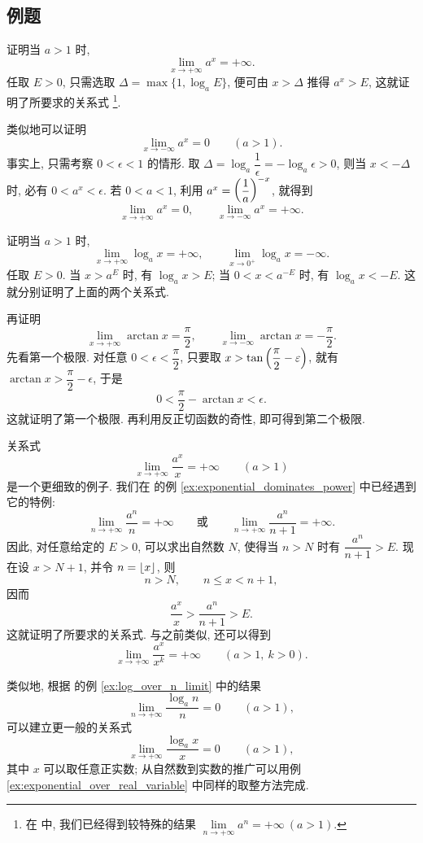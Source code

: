 \subsection{例题}\label{subsec:54}
\label{ex:exponential_limits_at_infinity}
证明当 $a>1$ 时,
$$
\lim_{x\to+\infty}a^x=+\infty.
$$
任取 $E>0$, 只需选取 $\Delta=\max\{1,\log_a E\}$,
便可由 $x>\Delta$ 推得 $a^x>E$, 这就证明了所要求的关系式
\footnote{在  中, 我们已经得到较特殊的结果
$\lim\limits_{n\to+\infty}a^n=+\infty\ (a>1)$.}.

类似地可以证明
$$
\lim_{x\to-\infty}a^x=0\qquad(a>1).
$$
事实上, 只需考察 $0<\epsilon<1$ 的情形.
取 $\Delta=\log_a\dfrac1\epsilon=-\log_a\epsilon>0$,
则当 $x<-\Delta$ 时, 必有 $0<a^x<\epsilon$.
若 $0<a<1$, 利用 $a^x=\left( \dfrac1a \right)^{-x}$, 就得到
$$
\lim_{x\to+\infty}a^x=0,
\qquad
\lim_{x\to-\infty}a^x=+\infty.
$$

\label{ex:logarithmic_limits_at_endpoints}
证明当 $a>1$ 时,
$$
\lim_{x\to+\infty}\log_a x=+\infty,
\qquad
\lim_{x\to0^+}\log_a x=-\infty.
$$
任取 $E>0$. 当 $x>a^E$ 时, 有 $\log_a x>E$;
当 $0<x<a^{-E}$ 时, 有 $\log_a x<-E$.
这就分别证明了上面的两个关系式.

\label{ex:arctangent_limits_at_infinity}
再证明
$$
\lim_{x\to+\infty}\arctan x=\frac\pi2,
\qquad
\lim_{x\to-\infty}\arctan x=-\frac\pi2.
$$
先看第一个极限. 对任意 $0<\epsilon<\dfrac\pi2$,
只要取 $x>\tan\left( \dfrac\pi2-\varepsilon \right)$, 就有
$\arctan x>\dfrac\pi2-\epsilon$, 于是
$$
0<\frac\pi2-\arctan x<\epsilon.
$$
这就证明了第一个极限. 再利用反正切函数的奇性, 即可得到第二个极限.

\label{ex:exponential_over_real_variable}
关系式
$$
\lim_{x\to+\infty}\frac{a^x}{x}=+\infty\qquad(a>1)
$$
是一个更细致的例子. 我们在  的例
\ref{ex:exponential_dominates_power} 中已经遇到它的特例:
$$
\lim_{n\to+\infty}\frac{a^n}{n}=+\infty
\qquad \text{或} \qquad
\lim_{n\to+\infty}\frac{a^n}{n+1}=+\infty.
$$
因此, 对任意给定的 $E>0$, 可以求出自然数 $N$,
使得当 $n>N$ 时有 $\dfrac{a^n}{n+1}>E$.
现在设 $x>N+1$, 并令 $n=\left\lfloor x \right\rfloor$, 则
$$
n>N,\qquad n\leqslant x<n+1,
$$
因而
$$
\frac{a^x}{x}>\frac{a^n}{n+1}>E.
$$
这就证明了所要求的关系式.
与之前类似, 还可以得到
$$
\lim_{x\to+\infty}\frac{a^x}{x^k}=+\infty
\qquad(a>1,\ k>0).
$$

\label{ex:logarithm_over_real_power}
类似地, 根据  的例 \ref{ex:log_over_n_limit} 中的结果
$$
\lim_{n\to+\infty}\frac{\log_a n}{n}=0\qquad(a>1),
$$
可以建立更一般的关系式
$$
\lim_{x\to+\infty}\frac{\log_a x}{x}=0\qquad(a>1),
$$
其中 $x$ 可以取任意正实数; 从自然数到实数的推广可以用例
\ref{ex:exponential_over_real_variable} 中同样的取整方法完成.

